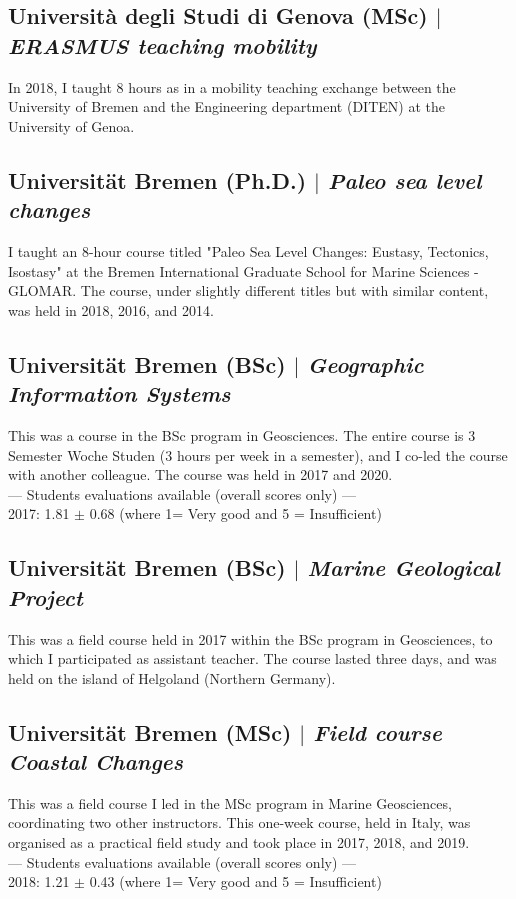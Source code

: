 \documentclass[11pt]{article}
\begin{document}
\subsection{Università degli Studi di Genova (MSc) $|$ {\normalfont\textit{ERASMUS teaching mobility}}}
{\footnotesize In 2018, I taught 8 hours as in a mobility teaching exchange between the University of Bremen and the Engineering department (DITEN) at the University of Genoa.}
\bigskip

\subsection{Universität Bremen  (Ph.D.) $|$ {\normalfont\textit{Paleo sea level changes}}}
{\footnotesize I taught an 8-hour course titled "Paleo Sea Level Changes: Eustasy, Tectonics, Isostasy" at the Bremen International Graduate School for Marine Sciences - GLOMAR. The course, under slightly different titles but with similar content, was held in 2018, 2016, and 2014.}
\bigskip

\subsection{Universität Bremen (BSc) $|$ {\normalfont\textit{Geographic Information Systems}}}
{\footnotesize This was a course in the BSc program in Geosciences. The entire course is 3 Semester Woche Studen (3 hours per week in a semester), and I co-led the course with another colleague. The course was held in 2017 and 2020. 
\\--- Students evaluations available (overall scores only) --- \\
2017: 1.81 $\pm$ 0.68 (where 1= Very good and 5 = Insufficient)}
\bigskip

\subsection{Universität Bremen  (BSc) $|$ {\normalfont\textit{Marine Geological Project}}}
{\footnotesize This was a field course held in 2017 within the BSc program in Geosciences, to which I participated as assistant teacher. The course lasted three days, and was held on the island of Helgoland (Northern Germany).}
\bigskip

\subsection{Universität Bremen  (MSc) $|$ {\normalfont\textit{Field course Coastal Changes}}}
{\footnotesize This was a field course I led in the MSc program in Marine Geosciences, coordinating two other instructors. This one-week course, held in Italy, was organised as a practical field study and took place in 2017, 2018, and 2019.
\\--- Students evaluations available (overall scores only) --- \\
2018: 1.21 $\pm$ 0.43 (where 1= Very good and 5 = Insufficient)}
\bigskip
\end{document}
